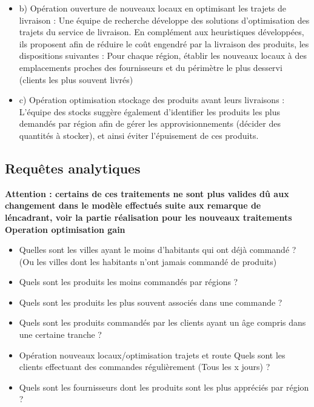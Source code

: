 \begin{itemize}
\begin{itemize}
\begin{itemize}
                \end{itemize}
        \end{itemize}
    \\
    \item b) Opération ouverture de nouveaux locaux en optimisant les trajets de livraison : 
Une équipe de recherche développe des solutions d’optimisation des trajets du service de livraison. En complément aux heuristiques développées, ils proposent afin de réduire le coût engendré par la livraison des produits, les dispositions suivantes : 
Pour chaque région, établir les nouveaux locaux à des emplacements proches des fournisseurs et du périmètre le plus desservi (clients les plus souvent livrés)
    \\
    \item c) Opération optimisation stockage des produits avant leurs livraisons : 
L’équipe des stocks suggère également d’identifier les produits les plus demandés par région afin de gérer les approvisionnements (décider des quantités à stocker), et ainsi éviter l’épuisement de ces produits.
\end{itemize}

\newpage 
\subsection{Requêtes analytiques} 
\textbf{Attention : certains de ces traitements ne sont plus valides dû aux changement dans le modèle effectués suite aux remarque de l\'encadrant, voir la partie réalisation pour les nouveaux traitements}
\textbf{Operation optimisation gain}
\begin{itemize}
    \item Quelles sont les villes ayant le moins d’habitants qui ont déjà commandé ? (Ou les villes dont les habitants n’ont jamais commandé de produits)
    \item Quels sont les produits les moins commandés par régions ? 
    \item Quels sont les produits les plus souvent associés dans une commande ?
    \item Quels sont les produits commandés par les clients ayant un âge compris dans une certaine tranche ?
    \item Opération nouveaux locaux/optimisation trajets et route 
Quels sont les clients effectuant des commandes régulièrement (Tous les x jours) ?
    \item Quels sont les fournisseurs dont les produits sont les plus appréciés par région ?
\end{itemize}

